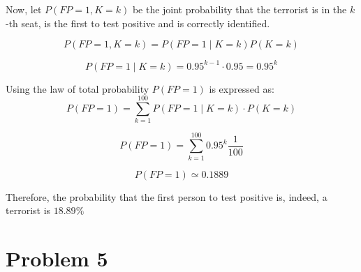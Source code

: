\documentclass[12pt]{report}
\begin{document}
Now, let $P(FP = 1 , K=k)$ be the joint probability that the terrorist is in the $k$-th seat, is the first to test positive and is correctly identified. 

\begin{equation*}
P(FP = 1 , K=k) = P(FP = 1 \mid K=k) P(K=k)
\end{equation*}





\begin{equation*}
P(FP = 1 \mid K=k) = 0.95^{k-1} \cdot 0.95 = 0.95^k
\end{equation*}

Using the law of total probability $P(FP=1)$ is expressed as:
\begin{equation*}
P(FP=1) = \sum_{k = 1}^{100} P(FP = 1 \mid K=k) \cdot P(K=k)
\end{equation*}


\begin{equation*}
P(FP=1) = \sum_{k = 1}^{100} 0.95^{k} \frac{1}{100}  
\end{equation*}

\begin{equation*}
P(FP=1) \simeq  0.1889
\end{equation*}

Therefore, the probability that the first person to test positive is, indeed, a terrorist is $18.89\%$

\section*{Problem 5}
\end{document}
